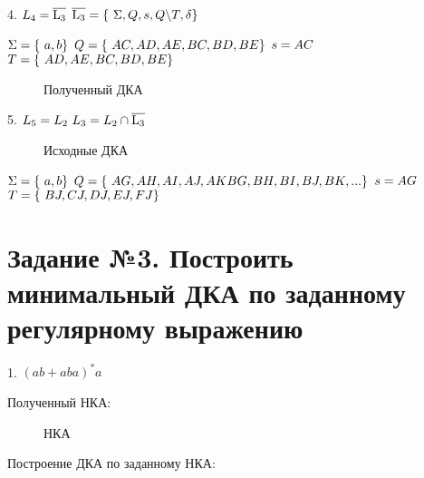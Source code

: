 \documentclass{article}
\begin{document}
4. $L_{4} =  \overline { \rm L_{3}} \\ $
$\overline { \rm L_{3}} = \{\ \Sigma, Q, s, Q \backslash T, \delta \}\ \\$

$\\ \Sigma = \{\ a, b \}\ \\ $
$Q = \{\ AC, AD, AE, BC, BD, BE \}\ \\ $
$s = AC \\ $
$T = \{\ AD, AE, BC, BD, BE \}\ \\ $

\begin{figure}[ht!]
{\centering 

\caption{Полученный ДКА}}
\end{figure}

5. $L_{5} =  L_{2} \ L_{3} = L_{2} \cap \overline { \rm L_{3}} \\ $

\begin{figure}[ht!]
{\centering 

\caption{Исходные ДКА} }
\end{figure}

$\\ \Sigma = \{\ a, b \}\ \\ $
$Q = \{\ AG, AH, AI, AJ, AK BG, BH, BI, BJ, BK, ... \}\ \\ $
$s = AG \\ $
$T = \{\ BJ, CJ, DJ, EJ, FJ \}\ \\ $



\section{Задание №3. Построить минимальный ДКА по заданному регулярному выражению}
1. ${(ab + aba)}^{*}a$

Полученный НКА:

\begin{figure}[ht!]
{\centering 
\vspace{2ex} 

\caption{НКА}}
\end{figure}

Построение ДКА по заданному НКА:

\begin{figure1}[ht!]
{\centering 
\vspace{2ex} 

\caption{Полученный ДКА}}
\end{figure1}
\end{document}
